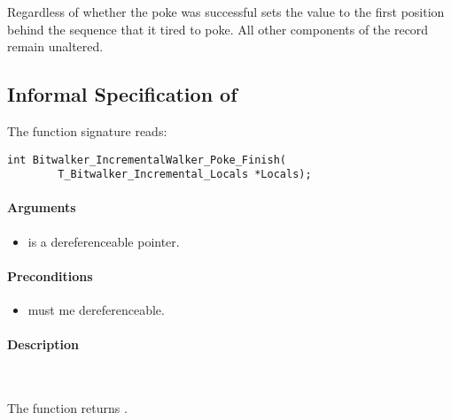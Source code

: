 Regardless of whether the poke was successful \pokenext sets the value   to the first position behind the sequence that it tired to poke.
 All other components of the record  remain unaltered.



\clearpage

\subsection{Informal Specification of }

 The function signature reads:\\[1em]

\begin{lstlisting}[style=acsl-block]
int Bitwalker_IncrementalWalker_Poke_Finish(
        T_Bitwalker_Incremental_Locals *Locals);
\end{lstlisting}

\paragraph{Arguments}
\begin{itemize}
   \item  {} is a dereferenceable pointer.
\end{itemize}

\paragraph{Preconditions}
\begin{itemize}
    \item  {} must me dereferenceable.
\end{itemize}

\paragraph{Description}~

The function  returns .





